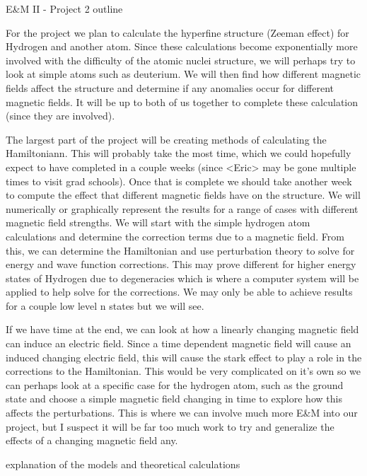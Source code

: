 \documentclass[11pt]{article}
\begin{document}
 

\begin{center}
	{\Large E\&M II - Project 2 outline}
\end{center}

For the project we plan to calculate the hyperfine structure (Zeeman effect) for Hydrogen and
another atom. Since these calculations become exponentially more involved with the difficulty of
the atomic nuclei structure, we will perhaps try to look at simple atoms such as deuterium. We
will then find how different magnetic fields affect the structure and determine if any anomalies
occur for different magnetic fields. It will be up to both of us together to complete these
calculation (since they are involved).

The largest part of the project will be creating methods of calculating the Hamiltoniann. This will
probably take the most time, which we could hopefully expect to have completed in a couple
weeks (since <Eric> may be gone multiple times to visit grad schools). Once that is complete
we should take another week to compute the effect that different magnetic fields have on the
structure. We will numerically or graphically represent the results for a range of cases with
different magnetic field strengths. We will start with the simple hydrogen atom calculations and
determine the correction terms due to a magnetic field. From this, we can determine the
Hamiltonian and use perturbation theory to solve for energy and wave function corrections. This
may prove different for higher energy states of Hydrogen due to degeneracies which is where a
computer system will be applied to help solve for the corrections. We may only be able to
achieve results for a couple low level n states but we will see.

If we have time at the end, we can look at how a linearly changing magnetic field can induce an
electric field. Since a time dependent magnetic field will cause an induced changing electric
field, this will cause the stark effect to play a role in the corrections to the Hamiltonian. This
would be very complicated on it’s own so we can perhaps look at a specific case for the
hydrogen atom, such as the ground state and choose a simple magnetic field changing in time
to explore how this affects the perturbations. This is where we can involve much more E\&M into
our project, but I suspect it will be far too much work to try and generalize the effects of a
changing magnetic field any.

\begin{center}
	{\Large explanation of the models and theoretical calculations}
\end{center}
\end{document}
